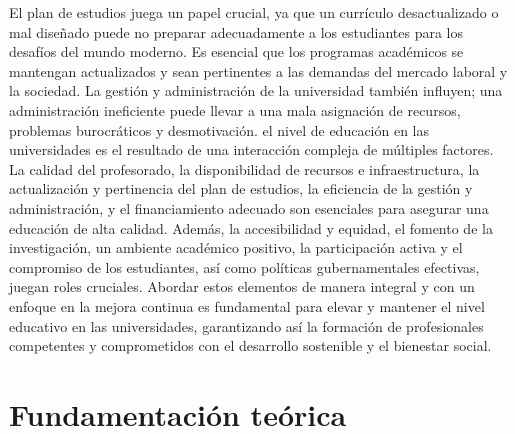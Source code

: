 El plan de estudios juega un papel crucial, ya que un currículo desactualizado o mal diseñado puede no preparar adecuadamente a los estudiantes para los desafíos del mundo moderno. Es esencial que los programas académicos se mantengan actualizados y sean pertinentes a las demandas del mercado laboral y la sociedad. La gestión y administración de la universidad también influyen; una administración ineficiente puede llevar a una mala asignación de recursos, problemas burocráticos y desmotivación.
el nivel de educación en las universidades es el resultado de una interacción compleja de múltiples factores. La calidad del profesorado, la disponibilidad de recursos e infraestructura, la actualización y pertinencia del plan de estudios, la eficiencia de la gestión y administración, y el financiamiento adecuado son esenciales para asegurar una educación de alta calidad. Además, la accesibilidad y equidad, el fomento de la investigación, un ambiente académico positivo, la participación activa y el compromiso de los estudiantes, así como políticas gubernamentales efectivas, juegan roles cruciales. Abordar estos elementos de manera integral y con un enfoque en la mejora continua es fundamental para elevar y mantener el nivel educativo en las universidades, garantizando así la formación de profesionales competentes y comprometidos con el desarrollo sostenible y el bienestar social.
%
%
    \section{Fundamentación teórica}
    
